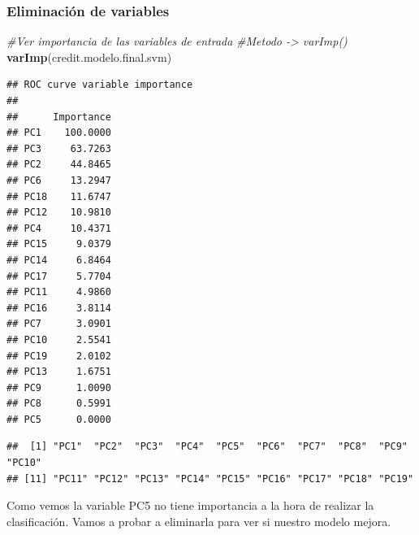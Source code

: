 \documentclass[
]{article}
\newenvironment{Shaded}{\begin{snugshade}}{\end{snugshade}}
\newcommand{\CommentTok}[1]{\textcolor[rgb]{0.56,0.35,0.01}{\textit{#1}}}
\newcommand{\ConstantTok}[1]{\textcolor[rgb]{0.56,0.35,0.01}{#1}}
\newcommand{\FunctionTok}[1]{\textcolor[rgb]{0.13,0.29,0.53}{\textbf{#1}}}
\newcommand{\NormalTok}[1]{#1}
\newcommand{\OtherTok}[1]{\textcolor[rgb]{0.56,0.35,0.01}{#1}}
\newcommand{\SpecialCharTok}[1]{\textcolor[rgb]{0.81,0.36,0.00}{\textbf{#1}}}
\begin{document}
\hypertarget{eliminaciuxf3n-de-variables}{%
\subsubsection{Eliminación de
variables}\label{eliminaciuxf3n-de-variables}}

\begin{Shaded}
\begin{Highlighting}[]
\CommentTok{\#Ver importancia de las variables de entrada}
\CommentTok{\#Metodo {-}\textgreater{} varImp()}
\FunctionTok{varImp}\NormalTok{(credit.modelo.final.svm)}
\end{Highlighting}
\end{Shaded}

\begin{verbatim}
## ROC curve variable importance
## 
##      Importance
## PC1    100.0000
## PC3     63.7263
## PC2     44.8465
## PC6     13.2947
## PC18    11.6747
## PC12    10.9810
## PC4     10.4371
## PC15     9.0379
## PC14     6.8464
## PC17     5.7704
## PC11     4.9860
## PC16     3.8114
## PC7      3.0901
## PC10     2.5541
## PC19     2.0102
## PC13     1.6751
## PC9      1.0090
## PC8      0.5991
## PC5      0.0000
\end{verbatim}

\begin{Shaded}
\end{Shaded}

\begin{verbatim}
##  [1] "PC1"  "PC2"  "PC3"  "PC4"  "PC5"  "PC6"  "PC7"  "PC8"  "PC9"  "PC10"
## [11] "PC11" "PC12" "PC13" "PC14" "PC15" "PC16" "PC17" "PC18" "PC19"
\end{verbatim}

Como vemos la variable PC5 no tiene importancia a la hora de realizar la
clasificación. Vamos a probar a eliminarla para ver si nuestro modelo
mejora.

\begin{Shaded}
\end{Shaded}
\end{document}
